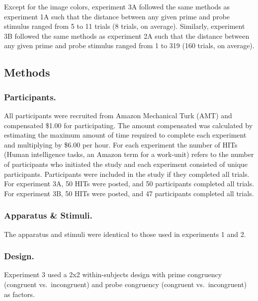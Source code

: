 \documentclass[]{DissertateCUNY}
\begin{document}
Except for the image colors, experiment 3A followed the same methods as
experiment 1A such that the distance between any given prime and probe
stimulus ranged from 5 to 11 trials (8 trials, on average). Similarly,
experiment 3B followed the same methods as experiment 2A such that the
distance between any given prime and probe stimulus ranged from 1 to 319
(160 trials, on average).

\hypertarget{methods-6}{%
\subsection{Methods}\label{methods-6}}

\hypertarget{participants.-2}{%
\subsubsection{Participants.}\label{participants.-2}}

All participants were recruited from Amazon Mechanical Turk (AMT) and
compensated \$1.00 for participating. The amount compensated was
calculated by estimating the maximum amount of time required to complete
each experiment and multiplying by \$6.00 per hour. For each experiment
the number of HITs (Human intelligence tasks, an Amazon term for a
work-unit) refers to the number of participants who initiated the study
and each experiment consisted of unique participants. Participants were
included in the study if they completed all trials. For experiment 3A,
50 HITs were posted, and 50 participants completed all trials. For
experiment 3B, 50 HITs were posted, and 47 participants completed all
trials.

\hypertarget{apparatus-stimuli.-2}{%
\subsubsection{Apparatus \& Stimuli.}\label{apparatus-stimuli.-2}}

The apparatus and stimuli were identical to those used in experiments 1
and 2.

\hypertarget{design.-1}{%
\subsubsection{Design.}\label{design.-1}}

Experiment 3 used a 2x2 within-subjects design with prime congruency
(congruent vs.~incongruent) and probe congruency (congruent
vs.~incongruent) as factors.
\end{document}
